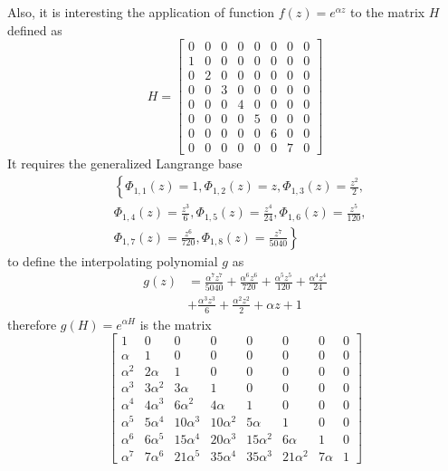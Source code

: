 Also, it is interesting the application of function $f(z)=e^{\alpha z}$ to the matrix $H$ defined as
\begin{displaymath}
H = \left[\begin{matrix}0 & 0 & 0 & 0 & 0 & 0 & 0 & 0\\1 & 0 & 0 & 0 & 0 & 0 & 0 & 0\\0 & 2 & 0 & 0 & 0 & 0 & 0 & 0\\0 & 0 & 3 & 0 & 0 & 0 & 0 & 0\\0 & 0 & 0 & 4 & 0 & 0 & 0 & 0\\0 & 0 & 0 & 0 & 5 & 0 & 0 & 0\\0 & 0 & 0 & 0 & 0 & 6 & 0 & 0\\0 & 0 & 0 & 0 & 0 & 0 & 7 & 0\end{matrix}\right]
\end{displaymath}
It requires the generalized Langrange base
\begin{displaymath}
\begin{split}
&\left\{\Phi_{ 1, 1 }{\left (z \right )} = 1, \Phi_{ 1, 2 }{\left (z \right )} = z, \Phi_{ 1, 3 }{\left (z \right )} = \frac{z^{2}}{2},\right. \\
&\Phi_{ 1, 4 }{\left (z \right )} = \frac{z^{3}}{6}, \Phi_{ 1, 5 }{\left (z \right )} = \frac{z^{4}}{24}, \Phi_{ 1, 6 }{\left (z \right )} = \frac{z^{5}}{120}, \\
&\left.\Phi_{ 1, 7 }{\left (z \right )} = \frac{z^{6}}{720}, \Phi_{ 1, 8 }{\left (z \right )} = \frac{z^{7}}{5040}\right\}
\end{split}
\end{displaymath}
to define the interpolating polynomial $g$ as
\begin{displaymath}
\begin{split}
g{\left (z \right )} &= \frac{\alpha^{7} z^{7}}{5040} + \frac{\alpha^{6} z^{6}}{720} + \frac{\alpha^{5} z^{5}}{120} + \frac{\alpha^{4} z^{4}}{24} \\
&+ \frac{\alpha^{3} z^{3}}{6} + \frac{\alpha^{2} z^{2}}{2} + \alpha z + 1
\end{split}
\end{displaymath}
therefore $g(H)=e^{\alpha H}$ is the matrix
\begin{displaymath}
\left[\begin{matrix}1 & 0 & 0 & 0 & 0 & 0 & 0 & 0\\\alpha & 1 & 0 & 0 & 0 & 0 & 0 & 0\\\alpha^{2} & 2 \alpha & 1 & 0 & 0 & 0 & 0 & 0\\\alpha^{3} & 3 \alpha^{2} & 3 \alpha & 1 & 0 & 0 & 0 & 0\\\alpha^{4} & 4 \alpha^{3} & 6 \alpha^{2} & 4 \alpha & 1 & 0 & 0 & 0\\\alpha^{5} & 5 \alpha^{4} & 10 \alpha^{3} & 10 \alpha^{2} & 5 \alpha & 1 & 0 & 0\\\alpha^{6} & 6 \alpha^{5} & 15 \alpha^{4} & 20 \alpha^{3} & 15 \alpha^{2} & 6 \alpha & 1 & 0\\\alpha^{7} & 7 \alpha^{6} & 21 \alpha^{5} & 35 \alpha^{4} & 35 \alpha^{3} & 21 \alpha^{2} & 7 \alpha & 1\end{matrix}\right]
\end{displaymath}
